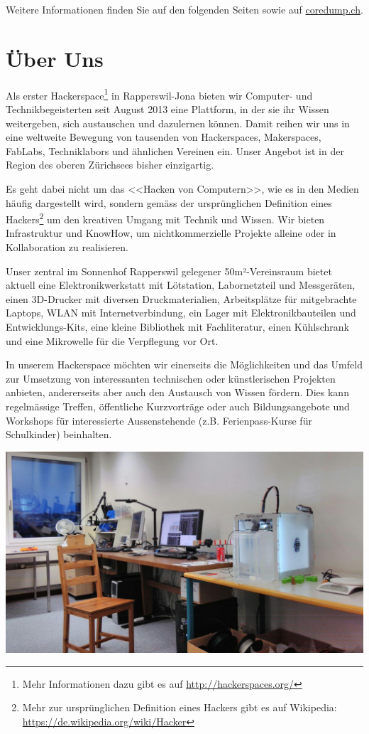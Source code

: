 \documentclass[10pt,a4paper,parskip,fleqn]{scrartcl}
\begin{document}
Weitere Informationen finden Sie auf den folgenden Seiten sowie auf
\url{coredump.ch}.

\newpage

\section{Über Uns}

Als erster Hackerspace\footnote{Mehr Informationen dazu gibt es auf
\url{http://hackerspaces.org/}} in Rapperswil-Jona bieten wir Computer- und
Technikbegeisterten seit August 2013 eine Plattform, in der sie ihr Wissen
weitergeben, sich austauschen und dazulernen können. Damit reihen wir uns in
eine weltweite Bewegung von tausenden von Hackerspaces, Makerspaces, FabLabs,
Techniklabors und ähnlichen Vereinen ein. Unser Angebot ist in der Region des
oberen Zürichsees bisher einzigartig.

Es geht dabei nicht um das <<Hacken von Computern>>, wie es in den Medien häufig
dargestellt wird, sondern gemäss der ursprünglichen Definition eines
Hackers\footnote{Mehr zur ursprünglichen Definition eines Hackers gibt es auf
Wikipedia: \url{https://de.wikipedia.org/wiki/Hacker}} um den kreativen Umgang
mit Technik und Wissen. Wir bieten Infrastruktur und KnowHow, um
nichtkommerzielle Projekte alleine oder in Kollaboration zu realisieren.

Unser zentral im Sonnenhof Rapperswil gelegener 50m²-Vereinsraum bietet aktuell
eine Elektronikwerkstatt mit Lötstation, Labornetzteil und Messgeräten, einen
3D-Drucker mit diversen Druckmaterialien, Arbeitsplätze für mitgebrachte
Laptops, WLAN mit Internetverbindung, ein Lager mit Elektronikbauteilen und
Entwicklungs-Kits, eine kleine Bibliothek mit Fachliteratur, einen Kühlschrank
und eine Mikrowelle für die Verpflegung vor Ort.

In unserem Hackerspace möchten wir einerseits die Möglichkeiten und das Umfeld
zur Umsetzung von interessanten technischen oder künstlerischen Projekten
anbieten, andererseits aber auch den Austausch von Wissen fördern. Dies kann
regelmässige Treffen, öffentliche Kurzvorträge oder auch Bildungsangebote und
Workshops für interessierte Aussenstehende (z.B. Ferienpass-Kurse für
Schulkinder) beinhalten.

\includegraphics[width=\textwidth]{img/raum.jpg}
\end{document}
